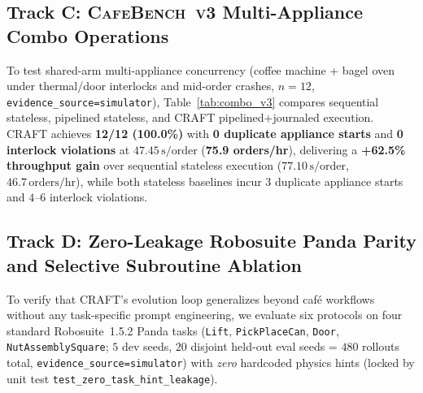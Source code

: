 \documentclass[10pt,journal]{IEEEtran}
\begin{document}
\begin{table}[t]
\centering
\caption{Sim-to-Sim Stage-2 Adaptation ($\le 5$ Target Trials, \texttt{simulator} + \texttt{recorded\_data}). Run~1 Preserved Honestly.}
\label{tab:sim2sim}
\resizebox{\linewidth}{!}{}
\end{table}

\subsection{Track C: \textsc{CafeBench~v3} Multi-Appliance Combo Operations}
To test shared-arm multi-appliance concurrency (coffee machine + bagel oven under thermal/door interlocks and mid-order crashes, $n{=}12$, \texttt{evidence\_source=simulator}), Table~\ref{tab:combo_v3} compares sequential stateless, pipelined stateless, and CRAFT pipelined+journaled execution. CRAFT achieves \textbf{12/12 (100.0\%)} with \textbf{0 duplicate appliance starts} and \textbf{0 interlock violations} at $47.45\,\mathrm{s}/\text{order}$ (\textbf{75.9 orders/hr}), delivering a \textbf{+62.5\% throughput gain} over sequential stateless execution ($77.10\,\mathrm{s}/\text{order}$, $46.7\,\text{orders/hr}$), while both stateless baselines incur $3$ duplicate appliance starts and $4$--$6$ interlock violations.

\begin{table}[t]
\centering
\caption{\textsc{CafeBench~v3} Shared-Arm Multi-Appliance Combo Operations ($n{=}12$, \texttt{evidence\_source=simulator}).}
\label{tab:combo_v3}
\resizebox{\linewidth}{!}{}
\end{table}

\subsection{Track D: Zero-Leakage Robosuite Panda Parity and Selective Subroutine Ablation}
To verify that CRAFT's evolution loop generalizes beyond café workflows without any task-specific prompt engineering, we evaluate six protocols on four standard Robosuite~1.5.2 Panda tasks (\texttt{Lift}, \texttt{PickPlaceCan}, \texttt{Door}, \texttt{NutAssemblySquare}; $5$ dev seeds, $20$ disjoint held-out eval seeds = $480$ rollouts total, \texttt{evidence\_source=simulator}) with \emph{zero} hardcoded physics hints (locked by unit test \texttt{test\_zero\_task\_hint\_leakage}).
\end{document}
